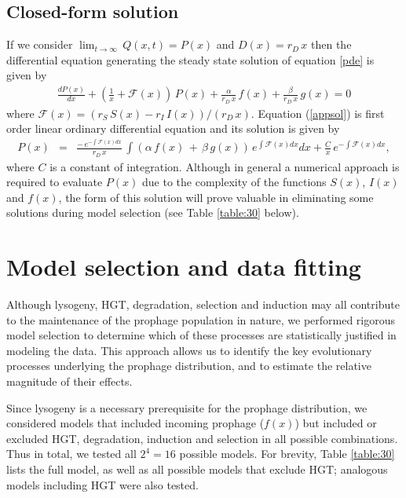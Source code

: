 \subsection{Closed-form solution}

If we consider $\lim_{t \to \infty}\,Q(x, t)=P(x)$ and  $D(x) = r_{D}\,x$
then the differential equation generating the steady state solution of equation \ref{pde} is given by \begin{eqnarray}\label{appsol}
 \frac{d P(x) }{d x}+ \left(\frac{1}{x}+\mathcal{F}(x)\right)\,P(x)+\frac{\alpha}{r_{D}\, x} \, f(x)  + \frac{\beta}{r_{D}\,x} \, g(x) =0
\end{eqnarray}
where $\mathcal{F}(x) = (r_S\, S(x) - r_I\, I(x))/(r_D\,x)$.
Equation (\ref{appsol}) is first order linear ordinary differential equation and its solution is given by 
\begin{eqnarray}\label{ssol}
 P(x) &=&\frac{-\,e^{-\int{\mathcal{F}}(x)dx} }{r_D\, x}\,\int{(\alpha \,f(x)\, + \, \beta\, g(x))\,e^{\int{\mathcal{F}}(x)dx}dx}+\frac{C}{x}\, e^{-\int{\mathcal{F}}(x)dx},
\end{eqnarray}
where $C$ is a constant of integration.  Although in general a numerical approach is required to evaluate $P(x)$ due to the complexity of the functions $S(x)$, $I(x)$ and $f(x)$, the form of this solution will prove valuable in eliminating some solutions during model selection (see Table \ref{table:30} below).


\section{Model selection and data fitting}\label{ns}
Although lysogeny, HGT, degradation, selection and induction may all contribute to the maintenance of the prophage population in nature, we performed rigorous model selection to determine which of these processes are statistically justified in modeling the data.  This approach allows us to identify the key evolutionary processes underlying the prophage distribution, and to estimate the relative magnitude of their effects.

Since lysogeny is a necessary prerequisite for the prophage distribution, we considered  models that included incoming prophage ($f(x)$) but included or excluded HGT, degradation, induction and selection in all possible combinations.  Thus in total, we tested all $2^4 = 16$ possible models.  For brevity, Table \ref{table:30} lists the full model, as well as all possible models that exclude HGT; analogous models including HGT were also tested.  
\renewcommand{\baselinestretch}{1}

